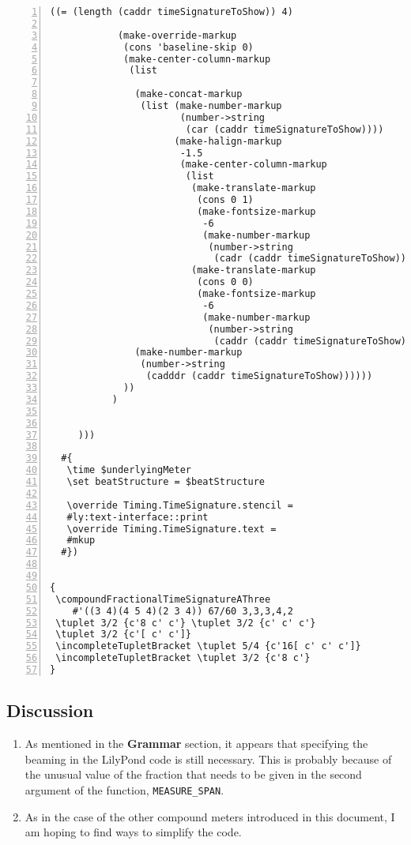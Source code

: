 \begin{Verbatim}[numbers=left,xleftmargin=5mm]
           ((= (length (caddr timeSignatureToShow)) 4)

            (make-override-markup
             (cons 'baseline-skip 0)
             (make-center-column-markup
              (list

               (make-concat-markup
                (list (make-number-markup
                       (number->string
                        (car (caddr timeSignatureToShow))))
                      (make-halign-markup
                       -1.5
                       (make-center-column-markup
                        (list
                         (make-translate-markup
                          (cons 0 1)
                          (make-fontsize-markup
                           -6
                           (make-number-markup
                            (number->string
                             (cadr (caddr timeSignatureToShow))))))
                         (make-translate-markup
                          (cons 0 0)
                          (make-fontsize-markup
                           -6
                           (make-number-markup
                            (number->string
                             (caddr (caddr timeSignatureToShow)))))))))))
               (make-number-markup
                (number->string
                 (cadddr (caddr timeSignatureToShow))))))
             ))
           )


     )))

  #{
   \time $underlyingMeter
   \set beatStructure = $beatStructure

   \override Timing.TimeSignature.stencil =
   #ly:text-interface::print
   \override Timing.TimeSignature.text =
   #mkup
  #})


{
 \compoundFractionalTimeSignatureAThree 
 	#'((3 4)(4 5 4)(2 3 4)) 67/60 3,3,3,4,2
 \tuplet 3/2 {c'8 c' c'} \tuplet 3/2 {c' c' c'}
 \tuplet 3/2 {c'[ c' c']}
 \incompleteTupletBracket \tuplet 5/4 {c'16[ c' c' c']}
 \incompleteTupletBracket \tuplet 3/2 {c'8 c'}
}
\end{Verbatim}



\subsection{Discussion}
\label{sec:compoundfractionalmeter_discussion_two}
\begin{enumerate}
\item As mentioned in the \textbf{Grammar} section, it appears that specifying the beaming in the LilyPond code is still necessary. This is probably because of the unusual value of the fraction that needs to be given in the second argument of the function, \verb|MEASURE_SPAN|.
\item As in the case of the other compound meters introduced in this document, I am hoping to find ways to simplify the code. 
\end{enumerate}



